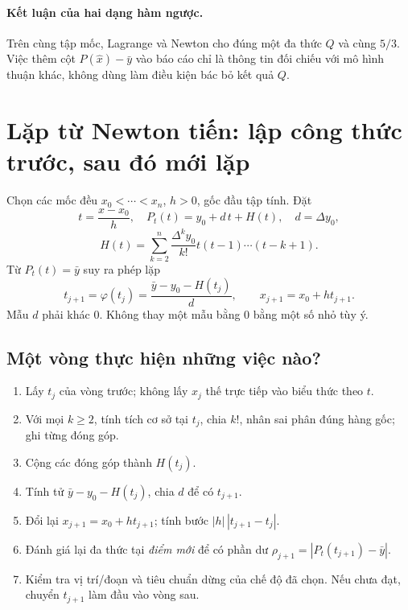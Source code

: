 \paragraph{Kết luận của hai dạng hàm ngược.} Trên cùng tập mốc, Lagrange và Newton cho đúng một đa thức $Q$ và cùng $5/3$. Việc thêm cột $P(\widehat x)-\bar y$ vào báo cáo chỉ là thông tin đối chiếu với mô hình thuận khác, không dùng làm điều kiện bác bỏ kết quả $Q$.

\section{Lặp từ Newton tiến: lập công thức trước, sau đó mới lặp}
\label{sec:inverse-forward}
Chọn các mốc đều $x_0<\cdots<x_n$, $h>0$, gốc đầu tập tính. Đặt
\[
 t=\frac{x-x_0}{h},\quad
 P_t(t)=y_0+d\,t+H(t),\quad d=\Delta y_0,
\]
\[
 H(t)=\sum_{k=2}^{n}\frac{\Delta^ky_0}{k!}
             t(t-1)\cdots(t-k+1).
\]
Từ $P_t(t)=\bar y$ suy ra phép lặp
\[
 \boxed{t_{j+1}=\varphi(t_j)=\frac{\bar y-y_0-H(t_j)}d},\qquad
 x_{j+1}=x_0+ht_{j+1}.
\]
Mẫu $d$ phải khác 0. Không thay một mẫu bằng 0 bằng một số nhỏ tùy ý.

\subsection{Một vòng thực hiện những việc nào?}
\begin{enumerate}
\item Lấy $t_j$ của vòng trước; không lấy $x_j$ thế trực tiếp vào biểu thức theo $t$.
\item Với mọi $k\ge2$, tính tích cơ sở tại $t_j$, chia $k!$, nhân sai phân đúng hàng gốc; ghi từng đóng góp.
\item Cộng các đóng góp thành $H(t_j)$.
\item Tính tử $\bar y-y_0-H(t_j)$, chia $d$ để có $t_{j+1}$.
\item Đổi lại $x_{j+1}=x_0+ht_{j+1}$; tính bước $|h|\,|t_{j+1}-t_j|$.
\item Đánh giá lại đa thức tại \emph{điểm mới} để có phần dư $\rho_{j+1}=|P_t(t_{j+1})-\bar y|$.
\item Kiểm tra vị trí/đoạn và tiêu chuẩn dừng của chế độ đã chọn. Nếu chưa đạt, chuyển $t_{j+1}$ làm đầu vào vòng sau.
\end{enumerate}


